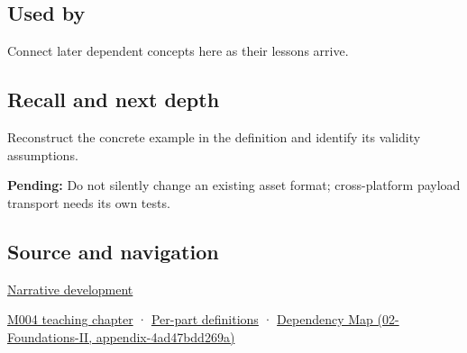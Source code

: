 \subsection{Used by}\label{appendix-e90053a4b201-used-by}

Connect later dependent concepts here as their lessons arrive.

\subsection{Recall and next depth}\label{appendix-e90053a4b201-recall-and-next-depth}

Reconstruct the concrete example in the definition and identify its validity assumptions.

\textbf{Pending:} Do not silently change an existing asset format; cross-platform payload transport needs its own tests.

\subsection{Source and navigation}\label{appendix-e90053a4b201-source-and-navigation}

\hyperref[01-foundations-i-ch001-choosing-what-information-to-keep]{Narrative development}

\hyperref[01-foundations-i-ch001-a-stretching-ruler-for-real-valued-quantities]{M004 teaching chapter} · \hyperref[appendix-fd090d982a15-m004---parts-61-76]{Per-part definitions} · \href{../02-Foundations-II/main.pdf\#nameddest=appendix-4ad47bdd269a}{Dependency Map (02-Foundations-II, appendix-4ad47bdd269a)}
